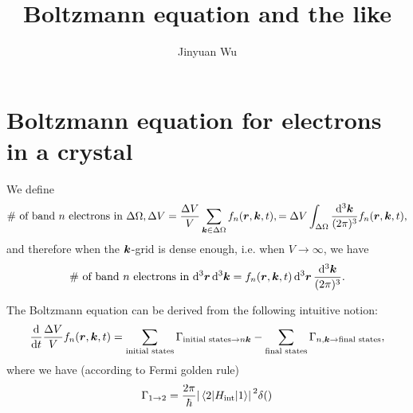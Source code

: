 \documentclass[hyperref, a4paper]{article}
\title{Boltzmann equation and the like}
\author{Jinyuan Wu}
\begin{document}
\maketitle

\section{Boltzmann equation for electrons in a crystal}

We define
\[
    \text{\# of band $n$ electrons in $\Delta \Omega, \Delta V$}
    = \frac{\Delta V}{V} \sum_{\vb*{k} \in \Delta \Omega} f_{n} (\vb*{r}, \vb*{k}, t),
    = \Delta V \int_{\Delta \Omega} \frac{\dd[3]{\vb*{k}}}{(2\pi)^3} f_n (\vb*{r}, \vb*{k}, t),
\]
and therefore when the $\vb*{k}$-grid is dense enough, i.e. when $V \to \infty$, we have 
\begin{equation}
    \text{\# of band $n$ electrons in $\dd[3]{\vb*{r}} \dd[3]{\vb*{k}}$} 
    = f_n(\vb*{r}, \vb*{k}, t) \dd[3]{\vb*{r}} \frac{\dd[3]{\vb*{k}}}{(2\pi)^3}.
\end{equation}

The Boltzmann equation can be derived from the following intuitive notion:
\[
    \dv{t} \frac{\Delta V}{V} f_n (\vb*{r}, \vb*{k}, t) 
    = \sum_{\text{initial states}} \Gamma_{\text{initial states} \to n \vb*{k}} 
    - \sum_{\text{final states}} \Gamma_{n, \vb*{k} \to \text{final states}} ,
\]
where we have (according to Fermi golden rule)
\begin{equation}
    \Gamma_{1 \to 2} = \frac{2\pi}{\hbar} 
    \abs*{\mel{2}{H_{\text{int}}}{1}}^2 
    \delta()
\end{equation}
\end{document}
